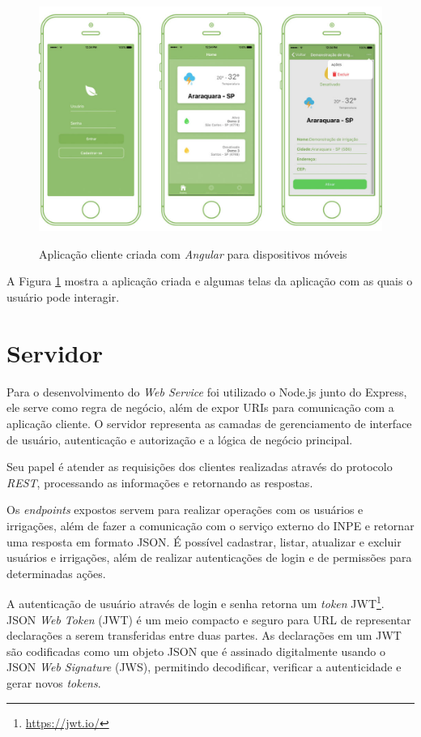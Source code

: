 \documentclass[
	12pt,				%
	openright,			%
	twoside,			%
	a4paper,			%
	english,			%
	brazil				%
	]{abntex2}
\begin{document}
\begin{figure}[h]
	\centering

	\caption{Aplicação cliente criada com \textit{Angular} para dispositivos móveis} \label{fig:ClientAppExample}
    \includegraphics[scale=0.35]{client-app} \\

\end{figure}

A Figura \ref{fig:ClientAppExample} mostra a aplicação criada e algumas telas da aplicação com as quais o usuário pode interagir.

\section{Servidor}

Para o desenvolvimento do \textit{Web Service} foi utilizado o Node.js junto do Express, ele serve como regra de negócio, além de expor URIs para comunicação com a aplicação cliente. O servidor representa as camadas de gerenciamento de interface de usuário, autenticação e autorização e a lógica de negócio principal.

Seu papel é atender as requisições dos clientes realizadas através do protocolo \textit{REST}, processando as informações e retornando as respostas.

Os \textit{endpoints} expostos servem para realizar operações com os usuários e irrigações, além de fazer a comunicação com o serviço externo do INPE e retornar uma resposta em formato JSON. É possível cadastrar, listar, atualizar e excluir usuários e irrigações, além de realizar autenticações de login e de permissões para determinadas ações. 

A autenticação de usuário através de login e senha retorna um \textit{token} JWT\footnote{\url{https://jwt.io/}}. JSON \textit{Web Token} (JWT) é um meio compacto e seguro para URL de representar declarações a serem transferidas entre duas partes. As declarações em um JWT são codificadas como um objeto JSON que é assinado digitalmente usando o JSON \textit{Web Signature} (JWS), permitindo decodificar, verificar a autenticidade e gerar novos \textit{tokens}.
\end{document}
